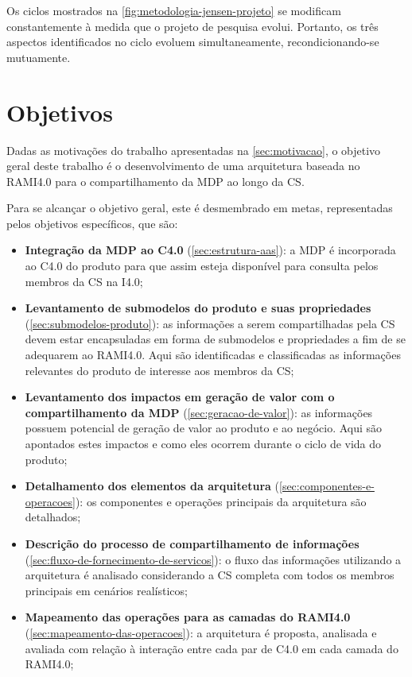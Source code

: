 Os ciclos mostrados na \autoref{fig:metodologia-jensen-projeto} se modificam constantemente à medida que o projeto de pesquisa evolui. Portanto, os três aspectos identificados no ciclo evoluem simultaneamente, recondicionando-se mutuamente.

\section{Objetivos}
\label{sec:objetivos}

Dadas as motivações do trabalho apresentadas na \autoref{sec:motivacao}, o objetivo geral deste trabalho é o desenvolvimento de uma arquitetura baseada no RAMI4.0 para o compartilhamento da MDP ao longo da CS.

Para se alcançar o objetivo geral, este é desmembrado em metas, representadas pelos objetivos específicos, que são:

\begin{itemize}
	\item \textbf{Integração da MDP ao C4.0} (\autoref{sec:estrutura-aas}): a MDP é incorporada ao C4.0 do produto para que assim esteja disponível para consulta pelos membros da CS na I4.0;
	\item \textbf{Levantamento de submodelos do produto e suas propriedades} (\autoref{sec:submodelos-produto}): as informações a serem compartilhadas pela CS devem estar encapsuladas em forma de submodelos e propriedades a fim de se adequarem ao RAMI4.0. Aqui são identificadas e classificadas as informações relevantes do produto de interesse aos membros da CS;
	\item \textbf{Levantamento dos impactos em geração de valor com o compartilhamento da MDP} (\autoref{sec:geracao-de-valor}): as informações possuem potencial de geração de valor ao produto e ao negócio. Aqui são apontados estes impactos e como eles ocorrem durante o ciclo de vida do produto;
	\item \textbf{Detalhamento dos elementos da arquitetura} (\autoref{sec:componentes-e-operacoes}): os componentes e operações principais da arquitetura são detalhados;
	\item \textbf{Descrição do processo de compartilhamento de informações} (\autoref{sec:fluxo-de-fornecimento-de-servicos}): o fluxo das informações utilizando a arquitetura é analisado considerando a CS completa com todos os membros principais em cenários realísticos;
	\item \textbf{Mapeamento das operações para as camadas do RAMI4.0} (\autoref{sec:mapeamento-das-operacoes}): a arquitetura é proposta, analisada e avaliada com relação à interação entre cada par de C4.0 em cada camada do RAMI4.0;
\end{itemize}

